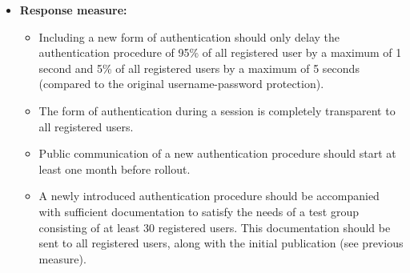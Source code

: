 \documentclass[a4paper,10pt]{article}
\begin{document}
\begin{itemize}
    \item \textbf{Response measure:}
        \begin{itemize}
            \item Including a new form of authentication should only delay the authentication procedure of 95\% of all registered user by a maximum of 1 second and 5\% of all registered users by a maximum of 5 seconds (compared to the original username-password protection).
            \item The form of authentication during a session is completely transparent to all registered users.
            \item Public communication of a new authentication procedure should start at least one month before rollout.
            \item A newly introduced authentication procedure should be accompanied with sufficient documentation to satisfy the needs of a test group consisting of at least 30 registered users. This documentation should be sent to all registered users, along with the initial publication (see previous measure).
        \end{itemize}
\end{itemize}
\end{document}
